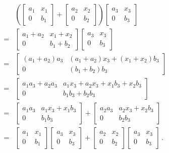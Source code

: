 \begin{align*}
  {}&
  \left(
    \begin{bmatrix}
      a_1 & x_1 \\
      0   & b_1
    \end{bmatrix}
    +
    \begin{bmatrix}
      a_2 & x_2 \\
      0   & b_2
    \end{bmatrix}
  \right)
  \begin{bmatrix}
    a_3 & x_3 \\
    0   & b_3
  \end{bmatrix}
  \\
  ={}&
  \begin{bmatrix}
    a_1 + a_2 & x_1 + x_2 \\
    0         & b_1 + b_2
  \end{bmatrix}
  \begin{bmatrix}
    a_3 & x_3 \\
    0   & b_3
  \end{bmatrix}
  \\
  ={}&
  \begin{bmatrix}
    (a_1 + a_2) a_3 & (a_1 + a_2) x_3 + (x_1 + x_2) b_3 \\
    0               & (b_1 + b_2) b_3
  \end{bmatrix}
  \\
  ={}&
  \begin{bmatrix}
    a_1 a_3 + a_2 a_3 & a_1 x_3 + a_2 x_3 + x_1 b_3 + x_2 b_3 \\
    0                 & b_1 b_3 + b_2 b_3
  \end{bmatrix}
  \\
  ={}&
  \begin{bmatrix}
    a_1 a_3 & a_1 x_3 + x_1 b_3 \\
    0       & b_1 b_3
  \end{bmatrix}
  +
  \begin{bmatrix}
    a_2 a_3 & a_2 x_3 + x_2 b_3 \\
    0       & b_2 b_3
  \end{bmatrix}
  \\
  ={}&
  \begin{bmatrix}
    a_1 & x_1 \\
    0   & b_1
  \end{bmatrix}
  \begin{bmatrix}
    a_3 & x_3 \\
    0   & b_3
  \end{bmatrix}
  +
  \begin{bmatrix}
    a_2 & x_2 \\
    0   & b_2
  \end{bmatrix}
  \begin{bmatrix}
    a_3 & x_3 \\
    0   & b_3
  \end{bmatrix} \,.
\end{align*}
